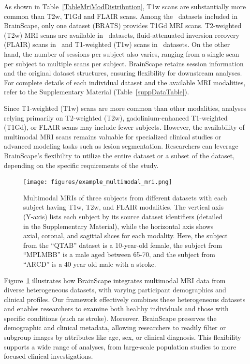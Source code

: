     
As shown in Table~\ref{TableMriModDistribution}, T1w scans are substantially more common than T2w, T1Gd and FLAIR scans.
Among the \NumDatasets\ datasets included in BrainScape, only one dataset (BRATS) provides T1Gd MRI scans. 
T2-weighted (T2w) MRI scans are available in \NumDatasetsWithTTwoScans\ datasets, 
fluid-attenuated inversion recovery (FLAIR) scans in \NumDatasetsWithTFlairScans\, 
and T1-weighted (T1w) scans in \NumDatasetsWithTToneScans\ datasets.
On the other hand, the number of sessions per subject also varies, 
ranging from a single scan per subject to multiple scans per subject. BrainScape 
retains session information and the original dataset structures, ensuring flexibility 
for downstream analyses. For complete details of each individual dataset and the available
MRI modalities, refer to the Supplementary Material (Table~\ref{suppDataTable}).

Since T1-weighted (T1w) scans are more common than other modalities, 
analyses relying primarily on T2-weighted (T2w), gadolinium-enhanced T1-weighted (T1Gd), or FLAIR scans may include fewer subjects. 
However, the availability of multimodal MRI scans remains valuable for specialized clinical studies or advanced modeling tasks such as lesion segmentation. 
Researchers can leverage BrainScape's flexibility to utilize the entire dataset or a subset of the dataset, depending on the specific requirements of the study.

\begin{figure}[ht]
    \centering
    \texttt{[image: figures/example\_multimodal\_mri.png]} 
    \caption{
        Multimodal MRIs of three subjects from different datasets with each subject having T1w, T2w, and FLAIR modalities. 
        The vertical axis (Y-axis) lists each subject by its source dataset identifiers (detailed in the Supplementary Material), 
        while the horizontal axis shows axial, coronal, and sagittal slices for each modality. 
        Here, the subject from the ``QTAB'' dataset is a 10-year-old female, 
        the subject from ``MPLMBB'' is a male aged between 65-70, 
        and the subject from ``ARCD'' is a 40-year-old male with a stroke. 
    }
    \label{fig:ExampleMultimodal}
\end{figure}

Figure~\ref{fig:ExampleMultimodal} illustrates how BrainScape integrates multimodal MRI data 
from diverse heterogeneous datasets, with varying participant demographics and clinical profiles. 
Our framework effectively combines these heterogeneous datasets and enables researchers 
to examine both healthy individuals and those with specific conditions (such as stroke). 
Moreover, BrainScape preserves the demographic and clinical metadata, allowing researchers 
to readily filter or subgroup images by attributes like age, sex, or clinical diagnosis. 
This flexibility supports a wide range of analyses, from large-scale population studies 
to more focused clinical investigations.

